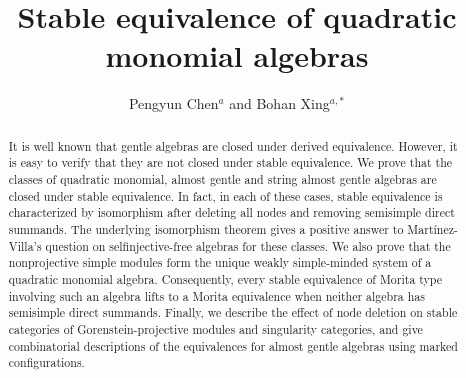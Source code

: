 \documentclass[11pt]{article}
\title{Stable equivalence of quadratic monomial algebras}
\author{Pengyun Chen$^{a}$ and Bohan Xing$^{a,*}$}
\date{}
\theoremstyle{definition}
\begin{document}
\maketitle


\begingroup
\renewcommand{\thefootnote}{}

\makeatletter
\renewcommand{\@makefntext}[1]{%
  \setlength{\parindent}{2em}%
  \noindent\hspace*{\parindent}#1}
\makeatother

\begin{NoHyper}
\end{NoHyper}
\endgroup

\begin{abstract}
It is well known that gentle algebras are closed under derived equivalence.
However, it is easy to verify that they are not closed under stable equivalence.
We prove that the classes of quadratic monomial, almost gentle and string almost gentle algebras are closed under stable equivalence.
In fact, in each of these cases, stable equivalence is characterized by isomorphism after deleting all nodes and removing semisimple direct summands.
The underlying isomorphism theorem gives a positive answer to Mart\'inez-Villa's question on selfinjective-free algebras for these classes.
We also prove that the nonprojective simple modules form the unique weakly simple-minded system of a quadratic monomial algebra.
Consequently, every stable equivalence of Morita type involving such an algebra lifts to a Morita equivalence when neither algebra has semisimple direct summands.
Finally, we describe the effect of node deletion on stable categories of Gorenstein-projective modules and singularity categories, and give combinatorial descriptions of the equivalences for almost gentle algebras using marked configurations.
\end{abstract}
\end{document}
